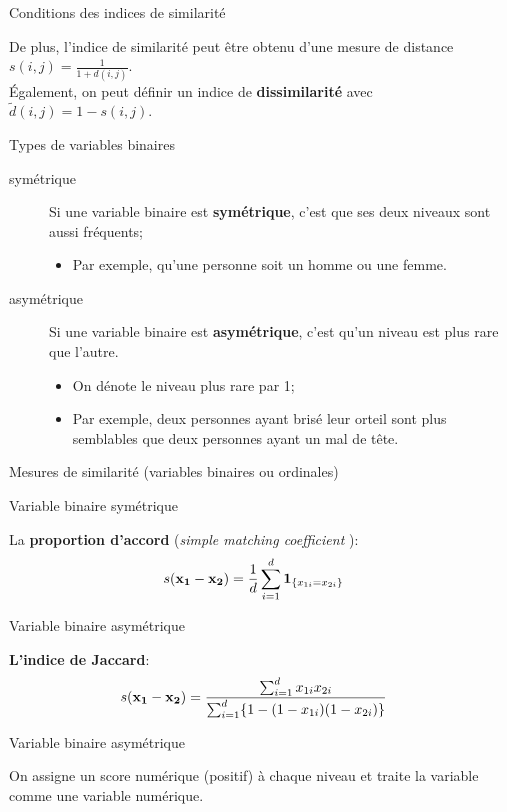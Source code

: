 \documentclass[10pt, french]{article}
\begin{document}
\begin{multicols*}{3}
\begin{conceptgen}{Conditions des indices de similarité}
\tcbline

De plus, l'indice de similarité peut être obtenu d'une mesure de distance $s(i, j) = \frac{1}{1 + d(i, j)}$.\\
Également, on peut définir un indice de \textbf{dissimilarité} avec $\tilde{d}(i, j) = 1 - s(i, j)$.
\end{conceptgen}

\begin{conceptgen}{Types de variables binaires}
\begin{description}
	\item[symétrique]	Si une variable binaire est \textbf{symétrique}, c'est que ses deux niveaux sont aussi fréquents;
		\begin{itemize}[leftmargin = *]
		\item	Par exemple, qu'une personne soit un homme ou une femme.
		\end{itemize}
	\item[asymétrique]	Si une variable binaire est \textbf{asymétrique}, c'est qu'un niveau est plus rare que l'autre.
		\begin{itemize}[leftmargin = *]
		\item	On dénote le niveau plus rare par 1;
		\item	Par exemple, deux personnes ayant brisé leur orteil sont plus semblables que deux personnes ayant un mal de tête.
		\end{itemize}
\end{description}
\end{conceptgen}

\begin{conceptgen}{Mesures de similarité (variables binaires ou ordinales)}
\begin{center}
	Variable binaire symétrique
\end{center}
La \textbf{proportion d'accord} (\og \textit{simple matching coefficient} \fg{}):
\begin{align*}
	s(\mathbf{x_{1} - x_{2}})
	&=	\frac{1}{d}	\sum_{i = 1}^{d} \bm{1}_{\{x_{1i} = x_{2i}\}}
\end{align*}
\tcbline
\begin{center}
	Variable binaire asymétrique
\end{center}
\textbf{L'indice de Jaccard}:
\begin{align*}
	s(\mathbf{x_{1} - x_{2}})
	&=	\frac{\sum_{i = 1}^{d} x_{1i}x_{2i}}{\sum_{i = 1}^{d} \{1 - (1 - x_{1i})(1 - x_{2i})\}}
\end{align*}
\tcbline
\begin{center}
	Variable binaire asymétrique
\end{center}
On assigne un score numérique (positif) à chaque niveau et traite la variable comme une variable numérique.
\end{conceptgen}


\end{multicols*}
\end{document}
